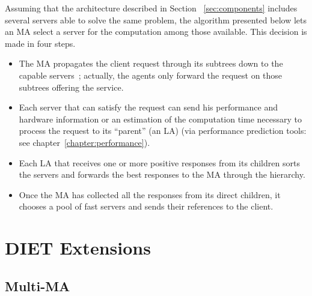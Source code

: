 Assuming that the architecture described in Section
~\ref{sec:components} includes several servers able to solve the
same problem, the algorithm presented below lets an MA select a
server for the computation among those available. This decision is
made in four steps.




\begin{itemize}
\item The MA propagates the client request through its subtrees down
  to the capable servers~; actually, the agents only forward the
  request on those subtrees offering the service.
\item Each server that can satisfy the request can send his 
  performance and hardware information or  an estimation of  the 
  computation time necessary to process the request to its ``parent'' (an LA)
  (via performance prediction tools: see chapter~\ref{chapter:performance}). 
\item Each LA that receives one or more positive responses from its
  children sorts the servers and forwards the best responses to the MA
  through the hierarchy.
\item Once the MA has collected all the responses from its direct
  children, it chooses a pool of fast servers and sends their
  references to the client.
\end{itemize}

\section{DIET Extensions}
\label{sec:extensions}

\subsection{Multi-MA}
\label{init:multima}

